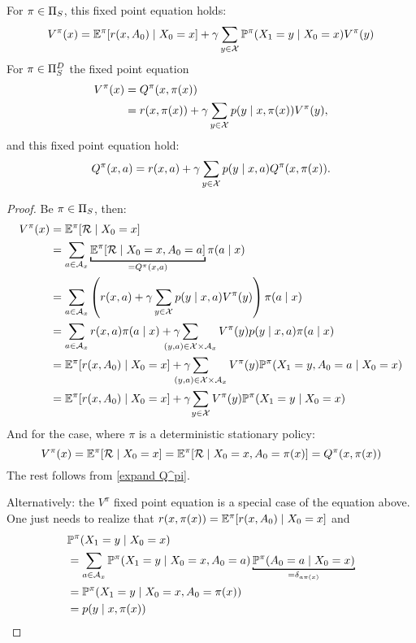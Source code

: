 \begin{corollary}\label{V^pi,Q^pi relation} 
For \(\pi\in\Pi_S\), this fixed point equation holds:
\[
	V^\pi(x) = \mathbb{E}^\pi[r(x,A_0)\mid X_0=x] 
	+ \gamma \sum_{y\in\mathcal{X}} \mathbb{P}^\pi(X_1=y \mid X_0=x) V^\pi(y)
\]	
For \(\pi\in\Pi_S^D\) the fixed point equation
\begin{align*}
	V^\pi(x)&=Q^\pi(x,\pi(x))\\
	 &=r(x,\pi(x))+\gamma\sum\limits_{y\in\mathcal{X}}p(y\mid x,\pi(x))V^\pi(y),
\end{align*}
and this fixed point equation hold:
\[
	Q^\pi(x,a)=r(x,a)+\gamma\sum_{y\in\mathcal{X}}p(y\mid x,a)Q^\pi(x,\pi(x)).
\]
\end{corollary}

\begin{proof} Be \(\pi\in\Pi_S\), then:
	\begin{align}
		V^\pi(x)&=\E^\pi[\cR\mid X_0=x] \nonumber\\
		&=\sum_{a\in\cA_x} 
		\underbracket[1pt]{\E^\pi[\cR\mid X_0=x, A_0=a]}_{=Q^\pi(x,a)}\label{stoch pi: V^pi in terms of Q^pi}
		\pi(a\mid x)\\
		&=\sum_{a\in\cA_x} \left(r(x,a)
		+\gamma\sum_{y\in\cX}p(y\mid x,a)V^\pi(y)\right)\pi(a\mid x)\nonumber\\
		&=\sum_{a\in\cA_x}r(x,a)\pi(a\mid x) 
		+ \gamma\smashoperator[l]{\sum_{(y,a)\in\cX\times\cA_x}} 
		V^\pi(y) p(y\mid x,a)\pi(a\mid x)
		\label{stoch pi: fixpoint proof}\\
		&=\E^\pi[r(x,A_0)\mid X_0=x] 
		+ \gamma\smashoperator[l]{\sum_{(y,a)\in\cX\times\cA_x}} V^\pi(y)
		\Pr^\pi(X_1=y, A_0=a \mid X_0=x)\nonumber\\
		&=\E^\pi[r(x,A_0)\mid X_0=x] + \gamma\smashoperator[l]{\sum_{y\in\cX}} V^\pi(y)
		\Pr^\pi(X_1=y\mid X_0=x)\nonumber
	\end{align}
	And for the case, where \(\pi\) is a deterministic stationary policy:
	\[
		V^\pi(x)=\mathbb{E}^\pi[\mathcal{R}\mid X_0=x]=\mathbb{E}^\pi[\mathcal{R}\mid X_0=x, A_0=\pi(x)]=Q^\pi(x,\pi(x))
	\]
	The rest follows from \ref{expand Q^pi}. 
	
	Alternatively: the \(V^\pi\) fixed point equation is a special case of the equation above. One just needs to realize that \(r(x,\pi(x)) = \mathbb{E}^\pi[r(x,A_0)\mid X_0=x]\) and
	\begin{align*}
		&\Pr^\pi(X_1=y\mid X_0=x)\\
		&=\sum_{a\in\cA_x} \Pr^\pi(X_1=y\mid X_0=x, A_0=a) 
		\underbracket[1pt][1pt]{\Pr^\pi(A_0=a\mid X_0=x)}_{=\delta_{a\pi(x)}}\\
		&=\Pr^\pi(X_1=y\mid X_0=x, A_0=\pi(x))\\
		&=p(y\mid x,\pi(x))\qedhere
	\end{align*}
\end{proof}

